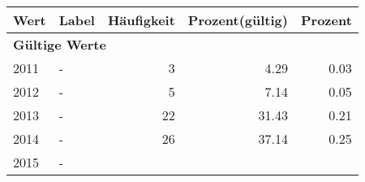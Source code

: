      \begin{longtable}{lXrrr}
     \toprule
     \textbf{Wert} & \textbf{Label} & \textbf{Häufigkeit} & \textbf{Prozent(gültig)} & \textbf{Prozent} \\
     \endhead
     \midrule
     \multicolumn{5}{l}{\textbf{Gültige Werte}}\\

     2011 &
     \multicolumn{1}{X}{ -  } &


       \num{3} &
       \num[round-mode=places,round-precision=2]{4,29} &
         \num[round-mode=places,round-precision=2]{0,03} \\

     2012 &
     \multicolumn{1}{X}{ -  } &


       \num{5} &
       \num[round-mode=places,round-precision=2]{7,14} &
         \num[round-mode=places,round-precision=2]{0,05} \\

     2013 &
     \multicolumn{1}{X}{ -  } &


       \num{22} &
       \num[round-mode=places,round-precision=2]{31,43} &
         \num[round-mode=places,round-precision=2]{0,21} \\

     2014 &
     \multicolumn{1}{X}{ -  } &


       \num{26} &
       \num[round-mode=places,round-precision=2]{37,14} &
         \num[round-mode=places,round-precision=2]{0,25} \\

     2015 &
     \multicolumn{1}{X}{ -  } &



\end{longtable}
